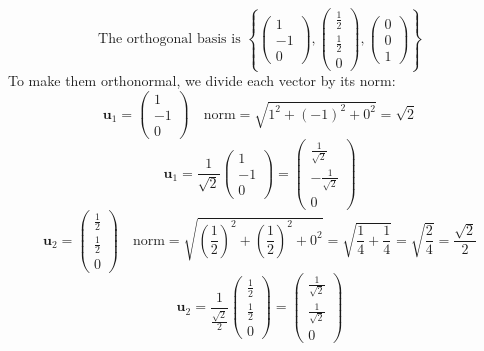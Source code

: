 \documentclass[a3paper,12pt]{extarticle} %
\begin{document}
\begin{enumerate}
\begin{enumerate}
\[        \]
        \[
            \text{The orthogonal basis is } \left\{ \begin{pmatrix} 1 \\ -1 \\ 0 \end{pmatrix}, \begin{pmatrix} \frac{1}{2} \\ \frac{1}{2} \\ 0 \end{pmatrix}, \begin{pmatrix} 0 \\ 0 \\ 1 \end{pmatrix} \right\}
        \]
        To make them orthonormal, we divide each vector by its norm:
        \[
            \mathbf{u}_1 = \begin{pmatrix} 1 \\ -1 \\ 0 \end{pmatrix} \quad \text{norm} = \sqrt{1^2 + (-1)^2 + 0^2} = \sqrt{2}
        \]
        \[
            \mathbf{u}_1 = \frac{1}{\sqrt{2}} \begin{pmatrix} 1 \\ -1 \\ 0 \end{pmatrix} = \begin{pmatrix} \frac{1}{\sqrt{2}} \\ -\frac{1}{\sqrt{2}} \\ 0 \end{pmatrix}
        \]
        \[
            \mathbf{u}_2 = \begin{pmatrix} \frac{1}{2} \\ \frac{1}{2} \\ 0 \end{pmatrix} \quad \text{norm} = \sqrt{\left( \frac{1}{2} \right)^2 + \left( \frac{1}{2} \right)^2 + 0^2} = \sqrt{\frac{1}{4} + \frac{1}{4}} = \sqrt{\frac{2}{4}} = \frac{\sqrt{2}}{2}
        \]
        \[
            \mathbf{u}_2 = \frac{1}{\frac{\sqrt{2}}{2}} \begin{pmatrix} \frac{1}{2} \\ \frac{1}{2} \\ 0 \end{pmatrix} = \begin{pmatrix} \frac{1}{\sqrt{2}} \\ \frac{1}{\sqrt{2}} \\ 0 \end{pmatrix}
        \]
        \[
\]
\end{enumerate}
\end{enumerate}
\end{document}
